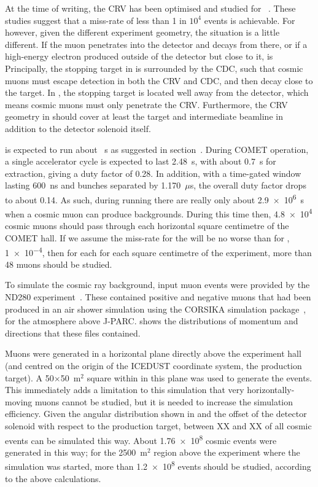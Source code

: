 At the time of writing, the \ac{CRV} has been optimised and studied for \phaseI~\cite{TDR2016,MeCM18Cosmics,DrutskoyCM20}.
These studies suggest that a miss-rate of less than 1 in $10^4$ events is achievable.
For \phaseII however, given the different experiment geometry, the situation is a little different.
If the muon penetrates into the detector and decays from there, or if a high-energy electron produced outside of the detector but close to it, is 
Principally, the stopping target in \phaseI is surrounded by the \ac{CDC}, such that cosmic muons must escape detection in both the \ac{CRV} and \ac{CDC}, and then decay close to the target.
In \phaseII, the stopping target is located well away from the detector, which means cosmic muons must only penetrate the \ac{CRV}.
Furthermore, the \ac{CRV} geometry in \phaseII should cover at least the target and intermediate beamline in addition to the detector solenoid itself.

\phaseII is expected to run about \VarRunTime~s as suggested in section~.
During COMET operation, a single accelerator cycle is expected to last 2.48~s, with about 0.7~s for extraction, giving a duty factor of 0.28.
In addition, with a time-gated window lasting 600~ns and bunches separated by 1.170~$\mu$s, the overall duty factor drops to about 0.14.
As such, during \phaseII running there are really only about \num{2.9e6}~s when a cosmic muon can produce backgrounds.
During this time then, \num{4.8e4} cosmic muons should pass through each horizontal square centimetre of the COMET hall.
If we assume the miss-rate for the \phaseII will be no worse than for \phaseI, \ie \num{1e-4}, then for each for each square centimetre of the experiment, more than 48 muons should be studied.

\FigBgCosmicBeam
\FigBgCosmicMomenta
To simulate the cosmic ray background, input muon events were provided by the ND280 experiment~\cite{George:2010aca}.
These contained positive and negative muons that had been produced in an air shower simulation using the CORSIKA simulation package~\cite{Corsika}, for the atmosphere above J-PARC.
 shows the distributions of momentum and directions that these files contained.

Muons were generated in a horizontal plane directly above the experiment hall (and centred on the origin of the ICEDUST coordinate system, the production target).
A 50$\times$50~m${}^2$ square within in this plane was used to generate the events.
This immediately adds a limitation to this simulation that very horizontally-moving muons cannot be studied, but it is needed to increase the simulation efficiency.
Given the angular distribution shown in  and the offset of the detector solenoid with respect to the production target, between XX and XX of all cosmic events can be simulated this way.
About \num{1.76e8} cosmic events were generated in this way; for the 2500~m${}^2$ region above the experiment where the simulation was started, more than \num{1.2e8} events should be studied, according to the above calculations.

